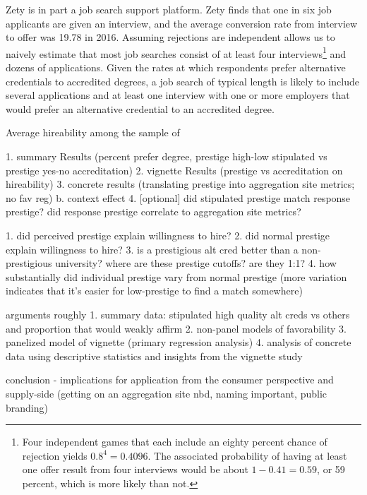 \documentclass[review]{elsarticle}
\begin{document}
Zety is in part a job search support platform.
Zety finds that one in six job applicants are given an interview,
and the average conversion rate from interview to offer was 19.78 in 2016\cite{turczynski_2021}.
Assuming rejections are independent allows us to naively estimate that most job searches consist of at least four interviews\footnote{
    Four independent games that each include an eighty percent chance of rejection yields $0.8^4 = 0.4096$.
    The associated probability of having at least one offer result from four interviews would be about $1 - 0.41 = 0.59$,
    or 59 percent, which is more likely than not.
} and dozens of applications.
Given the rates at which respondents prefer alternative credentials to accredited degrees,
a job search of typical length is likely to include several applications and at least one interview
with one or more employers that would prefer an alternative credential to an accredited degree.




Average hireability among the sample of 

1. summary Results (percent prefer degree, prestige high-low stipulated vs prestige yes-no accreditation)
2. vignette Results (prestige vs accreditation on hireability)
3. concrete results (translating prestige into aggregation site metrics; no fav reg)
    b. context effect
4. [optional] did stipulated prestige match response prestige? did response prestige correlate to aggregation site metrics?

1. did perceived prestige explain willingness to hire?
2. did normal prestige explain willingness to hire?
3. is a prestigious alt cred better than a non-prestigious university? where are these prestige cutoffs? are they 1:1?
4. how substantially did individual prestige vary from normal prestige (more variation indicates that it's easier for low-prestige to find a match somewhere)




arguments roughly
1. summary data: stipulated high quality alt creds vs others and proportion that would weakly affirm
2. non-panel models of favorability
3. panelized model of vignette (primary regression analysis)
4. analysis of concrete data using descriptive statistics and insights from the vignette study

conclusion - implications for application from the consumer perspective and supply-side (getting on an aggregation site nbd, naming important, public branding)
\end{document}
